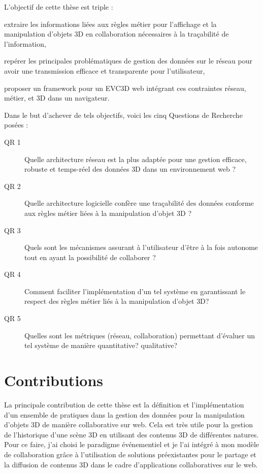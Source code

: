 L'objectif de cette thèse est triple : 
\begin{enumerate*}[label=(\roman*)]
	\item extraire les informations liées aux règles métier pour l'affichage et la 
	manipulation d'objets \gls{3D} en collaboration nécessaires à la traçabilité de 
	l'information,
	\item repérer les principales problématiques de gestion des données sur le 
	réseau pour avoir une transmission efficace et transparente pour l'utilisateur,
	\item proposer un \gls{framework} pour un \gls{EVC3D} web intégrant ces 
	contraintes réseau, métier, et \gls{3D} dans un navigateur.
\end{enumerate*}
Dans le but d'achever de tels objectifs, voici les cinq Questions de Recherche 
posées :
\begin{description}
	\item[QR 1] Quelle architecture réseau est la plus adaptée pour une gestion 
	efficace, robuste et temps-réel des données \gls{3D} dans un environnement 
	web ?
	
	\item[QR 2] Quelle architecture logicielle confère une traçabilité des données 
	conforme aux règles métier liées à la manipulation d'objet \gls{3D} ? 
	
	\item[QR 3] Quels sont les mécanismes assurant à l'utilisateur d'être à la fois 
	autonome tout en ayant la possibilité de collaborer ?
	
	
	\item[QR 4] Comment faciliter l'implémentation d'un tel système en garantissant 
	le respect des règles métier liés à la manipulation d'objet \gls{3D}?
	
	\item[QR 5] Quelles sont les métriques (réseau, collaboration) permettant 
	d'évaluer un tel système de manière quantitative? qualitative? %
	
\end{description}

\section{Contributions}

La principale contribution de cette thèse est la définition et l'implémentation d'un 
ensemble de pratiques dans la gestion des données pour la manipulation d'objets 
3D de manière collaborative sur web. Cela est très utile pour la gestion de 
l'historique d'une scène \gls{3D} en utilisant des contenus \gls{3D} de différentes 
natures. Pour ce faire, j'ai choisi le paradigme événementiel et je l'ai 
intégré à mon modèle de collaboration grâce à l'utilisation de solutions 
préexistantes pour le partage et la diffusion de contenus \gls{3D} dans le cadre 
d'applications collaboratives sur le web.


